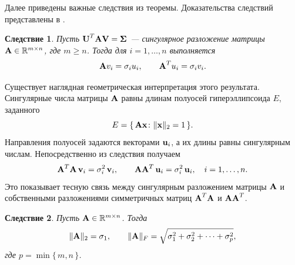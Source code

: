\documentclass[12pt]{article}
\newtheorem{corollary}{Следствие}
\begin{document}
	Далее приведены важные следствия из теоремы. Доказательства следствий представлены в \cite{golub}.
	
	\begin{corollary}
		Пусть $\textbf{\textup{U}}^{T} \textbf{\textup{A}} \textbf{\textup{V}} = \boldsymbol{\Sigma}$ --- сингулярное разложение матрицы 
		$\textbf{\textup{A}} \in \mathbb{R}^{m \times n}$, где $m \geqslant n$. 
		Тогда для $i = 1, \ldots, n$ выполняется
		\begin{equation}
			\textbf{\textup{A}} v_i = \sigma_i u_i, 
			\qquad 
			\textbf{\textup{A}}^{T} u_i = \sigma_i v_i.
		\end{equation}
	\end{corollary}
	
	Существует наглядная геометрическая интерпретация этого результата. 
	Сингулярные числа матрицы $\textbf{\textup{A}}$ равны длинам полуосей гиперэллипсоида $E$, заданного
	\begin{equation}
		E = \{\, \textbf{\textup{A}} \textbf{\textup{x}} \colon \|\textbf{\textup{x}}\|_{2} = 1 \,\}.
	\end{equation}
	Направления полуосей задаются векторами $\textbf{\textup{u}}_i$, а их длины равны сингулярным числам.
	Непосредственно из следствия получаем
	\begin{equation}
		\textbf{\textup{A}}^{T}\textbf{\textup{A}}\, \textbf{\textup{v}}_i = \sigma_i^{2}\, \textbf{\textup{v}}_i,
		\qquad
		\textbf{\textup{A}}\textbf{\textup{A}}^{T}\, \textbf{\textup{u}}_i = \sigma_i^{2}\, \textbf{\textup{u}}_i,
		\quad i = 1,\ldots,n.
	\end{equation}
	Это показывает тесную связь между сингулярным разложением матрицы $\textbf{\textup{A}}$ и собственными разложениями симметричных матриц 
	$\textbf{\textup{A}}^{T}\textbf{\textup{A}}$ и $\textbf{\textup{A}}\textbf{\textup{A}}^{T}$.
	
	\begin{corollary}
		Пусть $\textbf{\textup{A}} \in \mathbb{R}^{m \times n}$. Тогда
		\begin{equation}
			\|\textbf{\textup{A}}\|_{2} = \sigma_{1},
			\qquad
			\|\textbf{\textup{A}}\|_{F} = 
			\sqrt{\sigma_{1}^{2} + \sigma_{2}^{2} + \cdots + \sigma_{p}^{2}},
		\end{equation}
		где $p = \min\{\, m, n \,\}$.
	\end{corollary}
	
\end{document}
